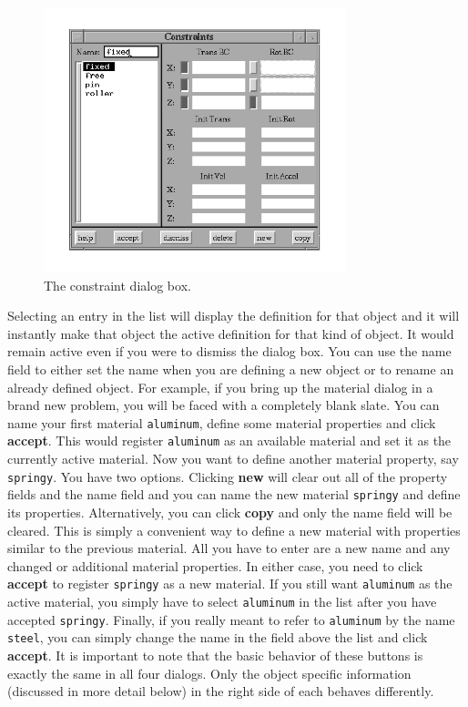 \begin{figure}
\begin{center}
 \includegraphics[width=3.45in]{figures/velvet_constraint}
\end{center}
\caption{The constraint dialog box.}
\label{velvet.constraint}
\end{figure}

Selecting an entry in the list will display
the definition for that object and it will instantly make that object the 
active definition for that kind of object.  It would remain active even if 
you were to dismiss the dialog box.  You can use the name field to either set
the name when you are defining a new object or to rename an already defined
object.  For example, if you bring up the material dialog in a
brand new problem, you will be faced with a completely blank slate.  You
can name your first material {\tt aluminum}, 
define some material properties and
click {\bf accept}.  This would register {\tt aluminum}
as an available material and
set it as the currently active material.  Now you want to define another 
material property, say {\tt springy}.  You have two options.  
Clicking {\bf new}
will clear out all of the property fields and the name field and you
can name the new material {\tt springy} and define its properties.  
Alternatively,
you can click {\bf copy} and only the name field will be cleared.  This is 
simply a convenient way to define a new material with properties similar
to the previous material.  All you have to enter are a new name and any
changed or additional material properties.
In either case, you need to click {\bf accept} to register {\tt springy}
as a new material.  If you still want {\tt aluminum} 
as the active material, you simply have to select {\tt aluminum} in the list 
after you have accepted {\tt springy}.  Finally, if you really meant to 
refer to {\tt aluminum} by the name {\tt steel}, you can simply change the name
in the field above the list and click {\bf accept}.  It is important to
note that the basic behavior of these buttons is exactly the
same in all four dialogs.  Only the object specific information
(discussed in more detail below)
in the right side of each behaves differently.

